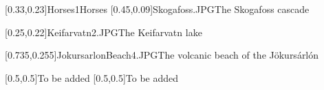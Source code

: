 



\graphicspath{{Figures/}{Figures/Iceland/}}


\subtitle{Day 3}
\date{28.10.2019}


    
    [0.33,0.23]{Horses1}{Horses}
    [0.45,0.09]{Skogafoss.JPG}{The Skogafoss cascade}
    
    [0.25,0.22]{Keifarvatn2.JPG}{The Keifarvatn lake}
    
    [0.735,0.255]{JokursarlonBeach4.JPG}{The volcanic beach of the J\"okurs\'arl\'on}
    
    [0.5,0.5]{}{To be added}
    [0.5,0.5]{}{To be added}

